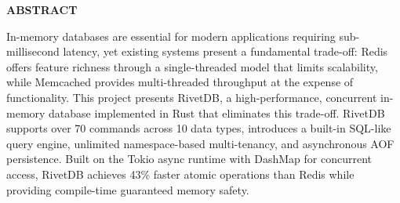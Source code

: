 \documentclass[12pt,a4paper]{report}
\numberwithin{figure}{subsection}
\numberwithin{table}{subsection}
\begin{document}
\makeatletter
\renewcommand{\@cftmaketoctitle}{
  \begin{center}
    {\fontsize{12}{14}\selectfont \textbf{INDEX}} \\[1.5\baselineskip]
  \end{center}
}
\renewcommand{\@cftmakeloftitle}{
  \begin{center}
    {\fontsize{12}{14}\selectfont \textbf{LIST OF FIGURES}} \\[1.5\baselineskip]
  \end{center}
}
\renewcommand{\@cftmakelottitle}{
  \begin{center}
    {\fontsize{12}{14}\selectfont \textbf{LIST OF TABLES}} \\[1.5\baselineskip]
  \end{center}
}
\makeatother

\setlength{\cftbeforechapskip}{1.2\baselineskip}
\setlength{\cftbeforesecskip}{0.5\baselineskip}

\newpage
\tableofcontents

\newpage
\listoffigures

\newpage
\listoftables

\newpage
\begin{center}
{\fontsize{12}{14}\selectfont \textbf{ABSTRACT}} \\[1.5\baselineskip]
\end{center}

In-memory databases are essential for modern applications requiring sub-millisecond latency, yet existing systems present a fundamental trade-off: Redis offers feature richness through a single-threaded model that limits scalability, while Memcached provides multi-threaded throughput at the expense of functionality. This project presents RivetDB, a high-performance, concurrent in-memory database implemented in Rust that eliminates this trade-off. RivetDB supports over 70 commands across 10 data types, introduces a built-in SQL-like query engine, unlimited namespace-based multi-tenancy, and asynchronous AOF persistence. Built on the Tokio async runtime with DashMap for concurrent access, RivetDB achieves 43\% faster atomic operations than Redis while providing compile-time guaranteed memory safety. 
\end{document}
